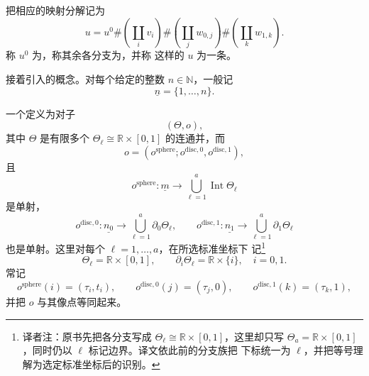 把相应的映射分解记为
\[
  u
  =
  u^0
  \#
  \left(\coprod_i v_i\right)
  \#
  \left(\coprod_j w_{0,j}\right)
  \#
  \left(\coprod_k w_{1,k}\right).
\]
称 $u^0$ 为\termPrincipalComponent{}，称其余各分支为\termBubbleComponent{}，并称
这样的 $u$ 为一条\termCuspTrajectory{}。

接着引入\termBrokenConfiguration{}的概念。对每个给定的整数 $n\in\mathbb N$，一般记
\[
  \underline n=\{1,\ldots,n\}.
\]

\begin{definition}
\label{def:broken-configuration}
一个\termBrokenConfiguration{}定义为对子
\[
  (\Theta,o),
\]
其中 $\Theta$ 是有限多个
$\Theta_\ell\cong\mathbb R\times[0,1]$ 的连通并，而
\[
  o=(o^{\mathrm{sphere}};o^{\mathrm{disc},0},o^{\mathrm{disc},1}),
\]
且
\[
  o^{\mathrm{sphere}}:
  \underline m
  \longrightarrow
  \bigcup_{\ell=1}^a\operatorname{Int}\Theta_\ell
\]
是单射，
\[
  o^{\mathrm{disc},0}:
  \underline{n_0}
  \longrightarrow
  \bigcup_{\ell=1}^a\partial_0\Theta_\ell,
  \qquad
  o^{\mathrm{disc},1}:
  \underline{n_1}
  \longrightarrow
  \bigcup_{\ell=1}^a\partial_1\Theta_\ell
\]
也是单射。这里对每个 $\ell=1,\ldots,a$，在所选标准坐标下
记\footnote{译者注：原书先把各分支写成
$\Theta_\ell\cong\mathbb R\times[0,1]$，这里却只写
$\Theta_a=\mathbb R\times[0,1]$，同时仍以 $\ell$ 标记边界。译文依此前的分支族把
下标统一为 $\ell$，并把等号理解为选定标准坐标后的识别。}
\[
  \Theta_\ell=\mathbb R\times[0,1],
  \qquad
  \partial_i\Theta_\ell=\mathbb R\times\{i\},
  \quad i=0,1.
\]
常记
\[
  o^{\mathrm{sphere}}(i)=(\tau_i,t_i),
  \qquad
  o^{\mathrm{disc},0}(j)=(\tau_j,0),
  \qquad
  o^{\mathrm{disc},1}(k)=(\tau_k,1),
\]
并把 $o$ 与其像点等同起来。
\end{definition}

